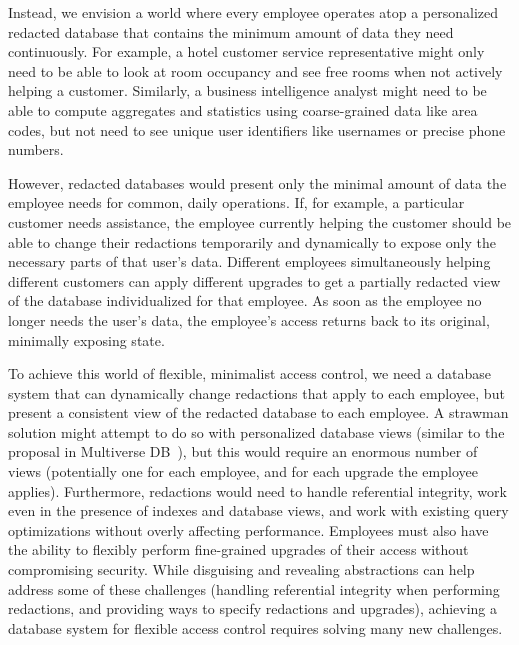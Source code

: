 Instead, we envision a world where every employee operates atop a personalized
redacted database that contains the minimum amount of data they need
continuously. For example, a hotel customer service representative might only
need to be able to look at room occupancy and see free rooms when not actively
helping a customer.
%
Similarly, a business intelligence analyst might need to be able to compute
aggregates and statistics using coarse-grained data like area codes, but not
need to see unique user identifiers like usernames or precise phone numbers.
%

%
However, redacted databases would present only the minimal amount of data the
employee needs for common, daily operations. If, for example, a particular
customer needs assistance, the employee currently helping the customer should be
able to change their redactions temporarily and dynamically to expose only the
necessary parts of that user's data.
%
Different employees simultaneously helping different customers can apply
different upgrades to get a partially redacted view of the database
individualized for that employee.
%
As soon as the employee no longer needs the user's data, the employee’s access
returns back to its original, minimally exposing state.

%
To achieve this world of flexible, minimalist access control, we need a database
system that can dynamically change redactions that apply to each employee, but
present a consistent view of the redacted database to each employee. A strawman
solution might attempt to do so with personalized database views (similar to the
proposal in Multiverse DB~\cite{multiverse}), but this would require an enormous
number of views (potentially one for each employee, and for each upgrade the
employee applies).
%
Furthermore, redactions would need to handle referential integrity, work even in
the presence of indexes and database views, and work with existing query
optimizations without overly affecting performance.
%
Employees must also have the ability to flexibly perform fine-grained upgrades
of their access without compromising security.
%
While disguising and revealing abstractions can help address some of these
challenges (\eg handling referential integrity when performing redactions, and
providing ways to specify redactions and upgrades), achieving a database system
for flexible access control requires solving many new challenges.
